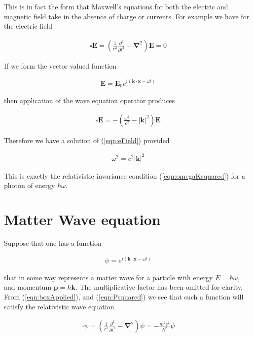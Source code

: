 \documentclass[]{eliblog}
\newcommand{\Abs}[1]{{\left\lvert{#1}\right\rvert}}
\newcommand{\BE}[0]{\mathbf{E}}
\newcommand{\Bk}[0]{\mathbf{k}}
\newcommand{\Bp}[0]{\mathbf{p}}
\newcommand{\Bx}[0]{\mathbf{x}}
\newcommand{\spacegrad}[0]{\boldsymbol{\nabla}}
\newcommand{\delambertian}[0]{\square}
\begin{document}
This is in fact the form that Maxwell's equations for both the electric and magnetic field take in the absence of charge or currents.
For example we have for the electric field

\begin{align}\label{eqn:eField}
\delambertian \BE = \left( \frac{1}{c^2}\frac{\partial^2}{{\partial t}^2} - \spacegrad^2 \right) \BE = 0
\end{align}

If we form the vector valued function

\begin{align}\label{eqn:testSolutionE}
\BE = \BE_0 e^{ i( \Bk \cdot \Bx - \omega t ) }
\end{align}

then application of the wave equation operator produces

\begin{align}\label{eqn:boxApplied}
\delambertian \BE = -\left( \frac{\omega^2}{c^2} - \Abs{\Bk}^2 \right) \BE
\end{align}

Therefore we have a solution of (\ref{eqn:eField}) provided

\begin{align}
\omega^2 = c^2 \Abs{\Bk}^2
\end{align}

This is exactly the relativistic invariance condition (\ref{eqn:omegaKsquared}) for a photon of energy $\hbar \omega$.

\section{Matter Wave equation}

Suppose that one has a function

\begin{align}\label{eqn:waveFunction}
\psi = e^{ i( \Bk \cdot \Bx - \omega t) }
\end{align}

that in some way represents a matter wave for a particle with energy $E = \hbar \omega$, and momentum
 $\Bp = \hbar \Bk$.  The multiplicative factor has been omitted for clarity.
From (\ref{eqn:boxApplied}), and 
(\ref{eqn:Psquared})
we see that such a function will satisfy the relativistic wave equation

\begin{align}
\delambertian \psi = \left( \frac{1}{c^2}\frac{\partial^2}{{\partial t}^2} - \spacegrad^2 \right) \psi = - \frac{m^2 c^2}{\hbar^2} \psi
\end{align}
\end{document}
